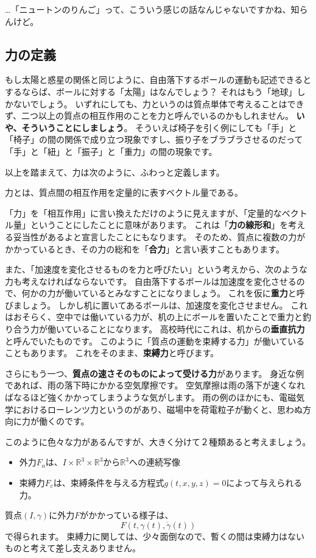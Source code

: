 …「ニュートンのりんご」って、こういう感じの話なんじゃないですかね、知らんけど。

\subsection{力の定義}

もし太陽と惑星の関係と同じように、自由落下するボールの運動も記述できるとするならば、ボールに対する「太陽」はなんでしょう？
それはもう「地球」しかないでしょう。
いずれにしても、力というのは質点単体で考えることはできず、二つ以上の質点の相互作用のことを力と呼んでいるのかもしれません。
\textbf{いや、そういうことにしましょう}。
そういえば椅子を引く例にしても「手」と「椅子」の間の関係で成り立つ現象ですし、振り子をブラブラさせるのだって「手」と「紐」と「振子」と「重力」の間の現象です。

以上を踏まえて、力は次のように、ふわっと定義します。
\begin{definition}
  力とは、質点間の相互作用を定量的に表すベクトル量である。
\end{definition}
「力」を「相互作用」に言い換えただけのように見えますが、「定量的なベクトル量」ということにしたことに意味があります。
これは「\textbf{力の線形和}」を考える妥当性があるよと宣言したことにもなります。
そのため、質点に複数の力がかかっているとき、その力の総和を「\textbf{合力}」と言い表すこともあります。

また、「加速度を変化させるものを力と呼びたい」という考えから、次のような力も考えなければならないです。
自由落下するボールは加速度を変化させるので、何かの力が働いているとみなすことになりましょう。
これを仮に\textbf{重力}と呼びましょう。
しかし机に置いてあるボールは、加速度を変化させません。
これはおそらく、空中では働いている力が、机の上にボールを置いたことで重力と釣り合う力が働いていることになります。
高校時代にこれは、机からの\textbf{垂直抗力}と呼んでいたものです。
このように「質点の運動を束縛する力」が働いていることもあります。
これをそのまま、\textbf{束縛力}と呼びます。

さらにもう一つ、\textbf{質点の速さそのものによって受ける力}があります。
身近な例であれば、雨の落下時にかかる空気摩擦です。
空気摩擦は雨の落下が速くなればなるほど強くかかってしまうような気がします。
雨の例のほかにも、電磁気学におけるローレンツ力というのがあり、磁場中を荷電粒子が動くと、思わぬ方向に力が働くのです。

このように色々な力があるんですが、大きく分けて２種類あると考えましょう。
\begin{itemize}
  \item 外力$F_a$は、$I\times\mathbb{R}^3\times\mathbb{R}^3$から$\mathbb{R}^3$への連続写像
  \item 束縛力$F_c$は、束縛条件を与える方程式$g(t,x,y,z)=0$によって与えられる力。
\end{itemize}
質点$(I,\gamma)$に外力$F$がかかっている様子は、
\[
  F(t,\gamma(t),\dot\gamma(t))
\]
で得られます。
束縛力に関しては、少々面倒なので、暫くの間は束縛力はないものと考えて差し支えありません。

